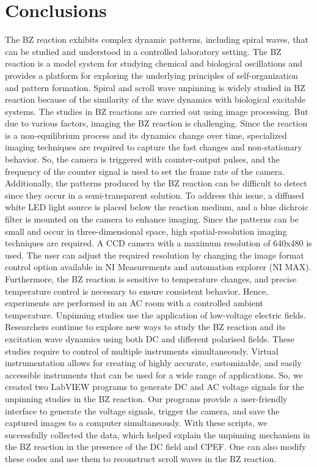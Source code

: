 \documentclass[journal=jacsat,manuscript=article]{achemso}
\begin{document}
\section{Conclusions} 
The BZ reaction exhibits complex dynamic patterns, including spiral waves, that can be studied and understood in a controlled laboratory setting. The BZ reaction is a model system for studying chemical and biological oscillations and provides a platform for exploring the underlying principles of self-organization and pattern formation. Spiral and scroll wave unpinning is widely studied in BZ reaction because of the similarity of the wave dynamics with biological excitable systems. 
The studies in BZ reactions are carried out using image processing. But due to various factors, imaging the BZ reaction is challenging. Since the reaction is a non-equilibrium process and its dynamics change over time, specialized imaging techniques are required to capture the fast changes and non-stationary behavior. So, the camera is triggered with counter-output pulses, and the frequency of the counter signal is used to set the frame rate of the camera. Additionally, the patterns produced by the BZ reaction can be difficult to detect since they occur in a semi-transparent solution. To address this issue, a diffused white LED light source is placed below the reaction medium, and a blue dichroic filter is mounted on the camera to enhance imaging. Since the patterns can be small and occur in three-dimensional space, high spatial-resolution imaging techniques are required. A CCD camera with a maximum resolution of 640x480 is used. The user can adjust the required resolution by changing the image format control option available in NI Measurements and automation explorer (NI MAX). Furthermore, the BZ reaction is sensitive to temperature changes, and precise temperature control is necessary to ensure consistent behavior. Hence, experiments are performed in an AC room with a controlled ambient temperature.
Unpinning studies use the application of low-voltage electric fields. Researchers continue to explore new ways to study the BZ reaction and its excitation wave dynamics using both DC and different polarised fields. These studies require to control of multiple instruments simultaneously. Virtual instrumentation allows for creating of highly accurate, customizable, and easily accessible instruments that can be used for a wide range of applications. So, we created two LabVIEW programs to generate DC and AC voltage signals for the unpinning studies in the BZ reaction. Our programs provide a user-friendly interface to generate the voltage signals, trigger the camera, and save the captured images to a computer simultaneously. With these scripts, we successfully collected the data, which helped explain the unpinning mechanism in the BZ reaction in the presence of the DC field and CPEF. One can also modify these codes and use them to reconstruct scroll waves in the BZ reaction.
\end{document}
